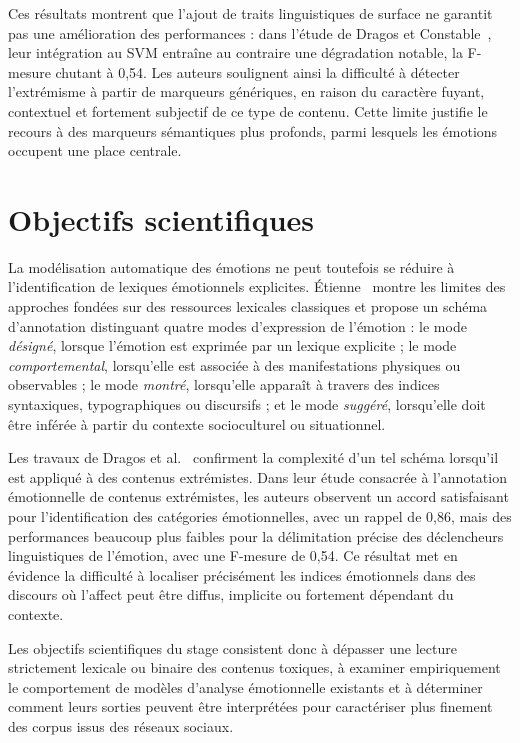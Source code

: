 Ces résultats montrent que l'ajout de traits linguistiques de surface ne garantit pas une amélioration des performances : dans l'étude de Dragos et Constable~\citep{dragos2023comparison}, leur intégration au SVM entraîne au contraire une dégradation notable, la F-mesure chutant à 0,54. Les auteurs soulignent ainsi la difficulté à détecter l'extrémisme à partir de marqueurs génériques, en raison du caractère fuyant, contextuel et fortement subjectif de ce type de contenu. Cette limite justifie le recours à des marqueurs sémantiques plus profonds, parmi lesquels les émotions occupent une place centrale.


\section*{Objectifs scientifiques}

La modélisation automatique des émotions ne peut toutefois se réduire à l'identification de lexiques émotionnels explicites. Étienne~\citep{etienne2023analyse} montre les limites des approches fondées sur des ressources lexicales classiques et propose un schéma d'annotation distinguant quatre modes d'expression de l'émotion : le mode \textit{désigné}, lorsque l'émotion est exprimée par un lexique explicite ; le mode \textit{comportemental}, lorsqu'elle est associée à des manifestations physiques ou observables ; le mode \textit{montré}, lorsqu'elle apparaît à travers des indices syntaxiques, typographiques ou discursifs ; et le mode \textit{suggéré}, lorsqu'elle doit être inférée à partir du contexte socioculturel ou situationnel.

Les travaux de Dragos et al.~\citep{dragos2022angry} confirment la complexité d'un tel schéma lorsqu'il est appliqué à des contenus extrémistes. Dans leur étude consacrée à l'annotation émotionnelle de contenus extrémistes, les auteurs observent un accord satisfaisant pour l'identification des catégories émotionnelles, avec un rappel de 0,86, mais des performances beaucoup plus faibles pour la délimitation précise des déclencheurs linguistiques de l'émotion, avec une F-mesure de 0,54. Ce résultat met en évidence la difficulté à localiser précisément les indices émotionnels dans des discours où l'affect peut être diffus, implicite ou fortement dépendant du contexte.

Les objectifs scientifiques du stage consistent donc à dépasser une lecture strictement lexicale ou binaire des contenus toxiques, à examiner empiriquement le comportement de modèles d'analyse émotionnelle existants et à déterminer comment leurs sorties peuvent être interprétées pour caractériser plus finement des corpus issus des réseaux sociaux.


